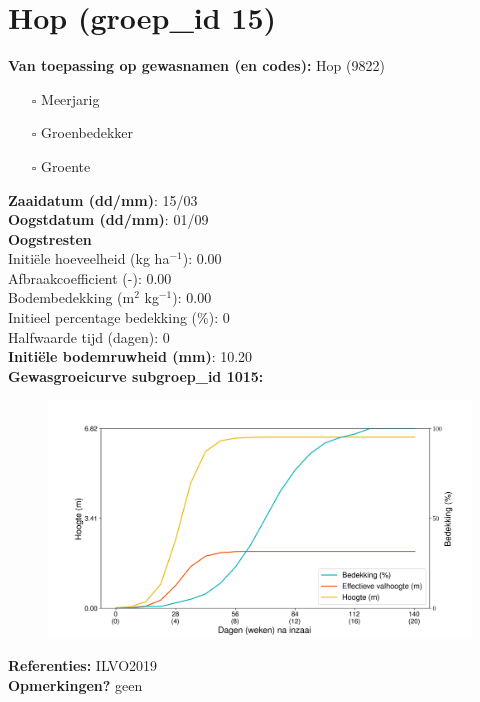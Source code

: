 \documentclass{article}
\begin{document}
 \section{Hop (groep\_id 15)} 
 \textbf{Van toepassing op gewasnamen (en codes):} Hop (9822) 
 \begin{multicols}{3} \begin{itemize} \item[$\square$] Meerjarig \item[$\square$] Groenbedekker \item[$\square$] Groente \end{itemize} \end{multicols} 
  \textbf{Zaaidatum (dd/mm)}: 15/03  \vspace{0.10cm} \\ 
  \textbf{Oogstdatum (dd/mm)}: 01/09  \vspace{0.10cm} \\ 
  \textbf{Oogstresten} \vspace{0.05cm} \\ 
  \tab Initi\"{e}le hoeveelheid (kg ha$^{-1}$): 0.00 \vspace{0.05cm} \\ 
  \tab Afbraakcoefficient (-): 0.00 \vspace{0.05cm} \\ 
  \tab Bodembedekking (m$^2$ kg$^{-1}$): 0.00 \vspace{0.05cm} \\ 
  \tab Initieel percentage bedekking (\%): 0 \vspace{0.05cm} \\ 
  \tab Halfwaarde tijd (dagen): 0 \vspace{0.05cm} \\ 
  \textbf{Initi\"{e}le bodemruwheid (mm)}: 10.20 \vspace{0.05cm} \\ 
  \textbf{Gewasgroeicurve subgroep\_id 1015:} 
 \begin{center} \begin{figure}[H] \includegraphics[width=12.5cm]{temp/1015.png} \end{figure} \end{center} 
  \textbf{Referenties:} ILVO2019 \vspace{0.10cm} \\ 
  \textbf{Opmerkingen?} geen \vspace{0.10cm} \\ 
 \newpage 
\end{document}
